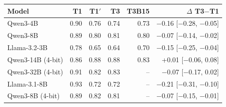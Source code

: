 \begin{tabular}{lrrrrr}
\toprule
Model & T1 & T1$'$ & T3 & T3B15 & $\Delta$ T3$-$T1 \\
\midrule
Qwen3-4B & 0.90 & 0.76 & 0.74 & 0.73 & $-$0.16 [$-$0.28, $-$0.05] \\
Qwen3-8B & 0.89 & 0.80 & 0.81 & 0.80 & $-$0.07 [$-$0.14, $-$0.02] \\
Llama-3.2-3B & 0.78 & 0.65 & 0.64 & 0.70 & $-$0.15 [$-$0.25, $-$0.04] \\
Qwen3-14B (4-bit) & 0.86 & 0.88 & 0.88 & 0.83 & +0.01 [$-$0.06, 0.08] \\
Qwen3-32B (4-bit) & 0.91 & 0.82 & 0.83 & -- & $-$0.07 [$-$0.17, 0.02] \\
Llama-3.1-8B & 0.93 & 0.72 & 0.72 & -- & $-$0.21 [$-$0.31, $-$0.10] \\
Qwen3-8B (4-bit) & 0.89 & 0.82 & 0.81 & -- & $-$0.07 [$-$0.15, $-$0.01] \\
\bottomrule
\end{tabular}
